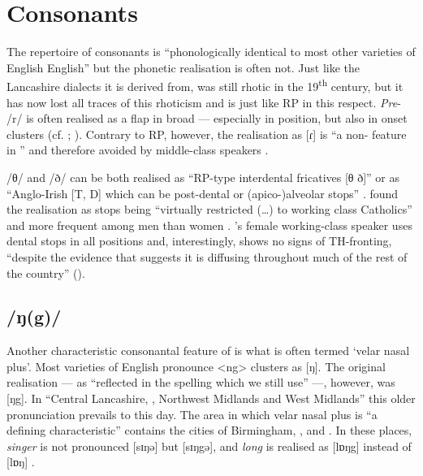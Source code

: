 	\section{Consonants}\label{sec.var.con}

The repertoire of  consonants is ``phonologically identical to most other varieties of English English'' \citep[351]{watson2007} but the phonetic realisation is often not.
Just like the Lancashire dialects it is derived from,  was still rhotic in the 19\textsuperscript{th} century, but it has now lost all traces of this rhoticism \citep[cf.][149]{knowles1997} and is just like RP in this respect.
\emph{Pre}- /r/ is often realised as a flap in broad  --- especially in  position, but also in onset clusters (cf. \citealt[107 and 329--330]{knowles1973}; \citealt[352]{watson2007}).
Contrary to RP, however, the realisation as [ɾ] is ``a non- feature in '' and therefore avoided by middle-class speakers \citep[329]{knowles1973}.

/θ/ and /ð/ can be both realised as ``RP-type interdental fricatives [θ ð]'' or as ``Anglo-Irish [T, D] which can be post-dental or (apico-)alveolar stops'' \citep[323]{knowles1973}.
\citeauthor{knowles1973} found the realisation as stops being ``virtually restricted (\ldots) to working class Catholics'' and more frequent among men than women \citep[323--324]{knowles1973}.
\cite{watson2007}'s female working-class speaker uses dental stops in all positions and, interestingly, shows no signs of TH-fronting, ``despite the evidence that suggests it is diffusing throughout much of the rest of the country'' (\cite[cf.][352]{watson2007}).

		\subsection{/ŋ(g)/}\label{sec.var.con.ng}

Another characteristic consonantal feature of  is what is often termed `velar nasal plus'.
Most varieties of English pronounce  <ng> clusters as [ŋ].
The original realisation --- as ``reflected in the spelling which we still use'' \citep[58]{trudgill1999} ---, however, was [ŋg]. In ``Central Lancashire, , Northwest Midlands and West Midlands'' \citep[58]{trudgill1999} this older pronunciation prevails to this day. 
The area in which velar nasal plus is ``a defining characteristic'' \citep[58]{trudgill1999} contains the cities of Birmingham, , and .
In these places, \emph{singer} is not pronounced [sɪŋə] but [sɪŋgə], and \emph{long} is realised as [lɒŋg] instead of [lɒŋ] \citep[cf.][58]{trudgill1999}.

